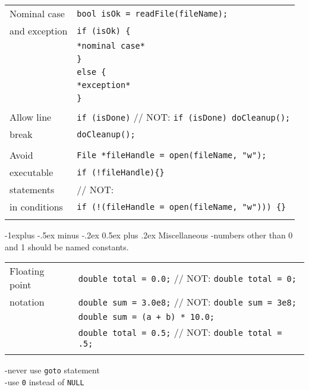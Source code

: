 \documentclass[10pt,landscape]{article}
\makeatletter
\renewcommand{\subsection}{\@startsection{subsection}{2}{0mm}%
                                {-1explus -.5ex minus -.2ex}%
                                {0.5ex plus .2ex}%
                                {\normalfont\normalsize\bfseries}}
\makeatother
\begin{document}
\begin{multicols}{3}
\begin{tabular}{@{}ll@{}}
	Nominal case  & \verb!bool isOk = readFile(fileName);! \\
	and exception & \verb!if (isOk) {! \\
	              & \hspace{0.2cm} \verb!*nominal case*! \\
	              & \verb!}! \\
	              & \verb!else {! \\
	              & \hspace{0.2cm} \verb!*exception*! \\
	              & \verb!}! \\
	              & \\
	Allow line    & \verb!if (isDone)! // NOT: \verb!if (isDone) doCleanup();! \\
	break         & \hspace{0.2cm} \verb!doCleanup();! \\
	              & \\
	Avoid         & \verb!File *fileHandle = open(fileName, "w");! \\
	executable    & \texttt{if (!fileHandle)\{\}} \\
	statements    & // NOT: \\
	in conditions & \texttt{if (!(fileHandle = open(fileName, "w"))) \{\}} \\
	              & \\
\end{tabular}

\subsection{Miscellaneous}
-numbers other than 0 and 1 should be named constants.\\

\begin{tabular}{@{}ll@{}}
	Floating point& \verb!double total = 0.0;! // NOT: \verb!double total = 0;! \\
	notation      & \verb!double sum = 3.0e8;! // NOT: \verb!double sum = 3e8;! \\
	              & \verb!double sum = (a + b) * 10.0;! \\
	              & \verb!double total = 0.5;! // NOT: \verb!double total = .5;! \\
	              & \\
\end{tabular}
-never use \verb!goto! statement \\
-use \verb!0! instead of \verb!NULL! \\


\end{multicols}
\end{document}
